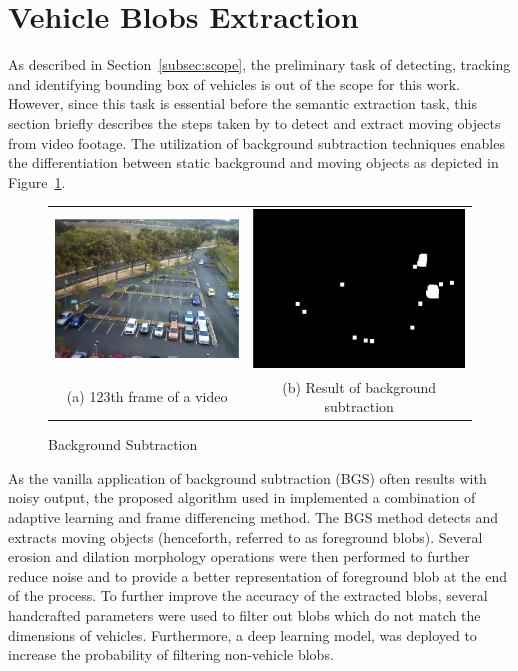 \section{Vehicle Blobs Extraction}
\label{subsection:fundamental}

As described in Section~\ref{subsec:scope}, the preliminary task of detecting, tracking and identifying bounding box of vehicles is out of the scope for this work. However, since this task is essential before the semantic extraction task, this section briefly describes the steps taken by  to detect and extract moving objects from video footage. The utilization of background subtraction techniques enables the differentiation between static background and moving objects as depicted in Figure~\ref{fig:bgs}.

\begin{figure}[htb!]
  \centering
\begin{tabular}{cc}
 \includegraphics[width=0.4\linewidth]{image/general/bgs1.png} &  \includegraphics[width=0.4\linewidth]{image/general/bgs2.png}  \\
(a) 123th frame of a video & (b) Result of background subtraction \\
\end{tabular}
\caption{Background Subtraction}
\label{fig:bgs}
\end{figure}

As the vanilla application of background subtraction (BGS) often results with noisy output, the proposed algorithm used in \cite{lim2017} implemented a combination of adaptive learning and frame differencing method. The BGS method detects and extracts moving objects (henceforth, referred to as foreground blobs).
Several erosion and dilation morphology operations were then performed to further reduce noise and to provide a better representation of foreground blob at the end of the process.
To further improve the accuracy of the extracted blobs, several handcrafted parameters were used to filter out blobs which do not match the dimensions of vehicles.
Furthermore, a deep learning model, was deployed to increase the probability of filtering non-vehicle blobs.



